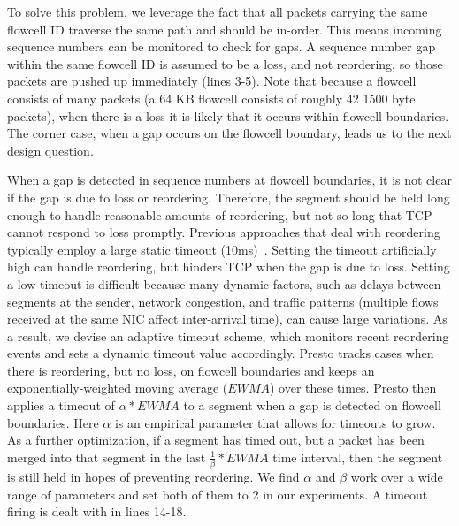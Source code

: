 To solve this problem, we leverage the fact that all packets carrying the same flowcell ID traverse the 
same path and should be in-order.
This means incoming sequence numbers can be monitored to check for
gaps. A sequence number gap within the same flowcell ID is assumed to be a loss, and not reordering,
so those packets are pushed up immediately (lines 3-5).
Note that because a flowcell consists of many packets (a 64 KB flowcell consists
of roughly 42 1500 byte packets), when there is a loss it is likely that it occurs within flowcell boundaries. 
The corner case, when a gap occurs on the flowcell boundary, leads us to the next design question.

When a gap is detected in sequence numbers at flowcell boundaries, it is not clear if the gap is due
to loss or reordering. Therefore, the segment should be held long enough to
handle reasonable amounts of reordering, but not so long that TCP cannot respond
to loss promptly. Previous approaches that deal with reordering typically employ a large static
timeout (10ms)~\cite{drb}. 
Setting the timeout artificially high can handle reordering, but hinders TCP when the gap is
due to loss. 
Setting a low timeout is difficult because many dynamic factors, such as delays between
segments at the sender, network congestion, and traffic patterns (multiple flows 
received at the same NIC affect inter-arrival time), can cause large variations.
As a result, we devise an adaptive timeout scheme, which monitors recent reordering events and sets a dynamic timeout value accordingly.
Presto tracks cases when there is reordering, but no loss, on flowcell boundaries and keeps an exponentially-weighted
moving average ($EWMA$) over these times. Presto then applies a timeout of $\alpha * EWMA$ to a segment when a gap is 
detected on flowcell boundaries. 
Here $\alpha$ is an empirical parameter that allows for timeouts to grow. As a further optimization, if a segment
has timed out, but a packet has been merged into that segment in the last $\frac{1}{\beta} * EWMA$ time interval, then 
the segment is still held in hopes of preventing reordering. We find $\alpha$ and $\beta$
work over a wide range of parameters and set both of them to 2 in our experiments. A timeout firing is dealt with in lines 14-18.


